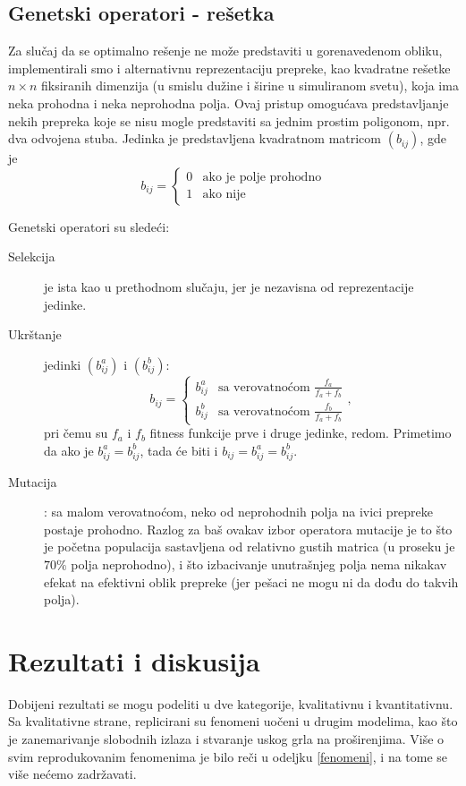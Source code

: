 \documentclass[12pt]{article}
\begin{document}
\subsection{Genetski operatori - rešetka}

Za slučaj da se optimalno rešenje ne može predstaviti u gorenavedenom obliku, implementirali smo i alternativnu reprezentaciju prepreke, kao kvadratne rešetke $n\times n$ fiksiranih dimenzija (u smislu dužine i širine u simuliranom svetu), koja ima neka prohodna i neka neprohodna polja. Ovaj pristup omogućava predstavljanje nekih prepreka koje se nisu mogle predstaviti sa jednim prostim poligonom, npr. dva odvojena stuba. Jedinka je predstavljena kvadratnom matricom $(b_{ij})$, gde je
$$
b_{ij} = 
\begin{cases}
    0 & \text{ako je polje prohodno}\\
    1 & \text{ako nije}
\end{cases}
$$

Genetski operatori su sledeći:
\begin{description}
\item[Selekcija] je ista kao u prethodnom slučaju, jer je nezavisna od reprezentacije jedinke.
\item[Ukrštanje] jedinki $(b^a_{ij})$ i $(b^b_{ij})$:
$$
b_{ij} = 
\begin{cases}
    b^a_{ij} & \text{sa verovatnoćom } \frac{f_a}{f_a+f_b}\\
    b^b_{ij} & \text{sa verovatnoćom } \frac{f_b}{f_a+f_b}
\end{cases},
$$
pri čemu su $f_a$ i $f_b$ fitness funkcije prve i druge jedinke, redom. Primetimo da ako je $ b^a_{ij} = b^b_{ij}$, tada će biti i $b_{ij} = b^a_{ij} = b^b_{ij}$.
\item[Mutacija]: sa malom verovatnoćom, neko od neprohodnih polja na ivici prepreke postaje prohodno. Razlog za baš ovakav izbor operatora mutacije je to što je početna populacija sastavljena od relativno gustih matrica (u proseku je $70\%$ polja neprohodno), i što izbacivanje unutrašnjeg polja nema nikakav efekat na efektivni oblik prepreke (jer pešaci ne mogu ni da dođu do takvih polja).
\end{description}

\section{Rezultati i diskusija}

Dobijeni rezultati se mogu podeliti u dve kategorije, kvalitativnu i kvantitativnu. Sa kvalitativne strane, replicirani su fenomeni uočeni u drugim modelima, kao što je zanemarivanje slobodnih izlaza i stvaranje uskog grla na proširenjima. Više o svim reprodukovanim fenomenima je bilo reči u odeljku \ref{fenomeni}, i na tome se više nećemo zadržavati.
\end{document}

